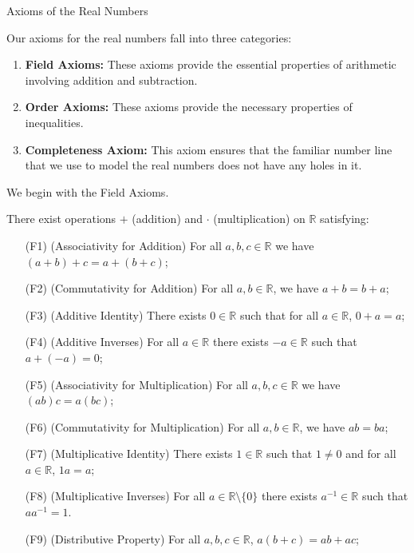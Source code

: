 \begin{section}{Axioms of the Real Numbers}\label{sec:AxiomsRealNumbers}

Our axioms for the real numbers fall into three categories:
\begin{enumerate}
\item \textbf{Field Axioms:} These axioms provide the essential properties of arithmetic involving addition and subtraction.
\item \textbf{Order Axioms:} These axioms provide the necessary properties of inequalities.
\item \textbf{Completeness Axiom:} This axiom ensures that the familiar number line that we use to model the real numbers does not have any holes in it.
\end{enumerate}

We begin with the Field Axioms.

\begin{axioms}\label{axiom:field axioms}
There exist operations $+$ (addition) and $\cdot$ (multiplication) on $\mathbb{R}$ satisfying:
\begin{enumerate}
\item[(F1)] (Associativity for Addition) For all $a, b, c\in \mathbb{R}$ we have $(a+b)+c = a+(b+c)$;
\item[(F2)] (Commutativity for Addition) For all $a,b\in \mathbb{R}$, we have $a+b=b+a$;
\item[(F3)] (Additive Identity) There exists $0\in\mathbb{R}$ such that for all $a\in\mathbb{R}$, $0+a=a$;
\item[(F4)] (Additive Inverses) For all $a\in\mathbb{R}$ there exists $-a\in\mathbb{R}$ such that $a+(-a)=0$;

\item[(F5)] (Associativity for Multiplication) For all $a, b, c\in \mathbb{R}$ we have $(ab)c = a(bc)$;
\item[(F6)] (Commutativity for Multiplication) For all $a,b\in \mathbb{R}$, we have $ab=ba$;
\item[(F7)] (Multiplicative Identity) There exists $1\in\mathbb{R}$ such that $1\neq 0$ and for all $a\in\mathbb{R}$, $1a=a$;
\item[(F8)] (Multiplicative Inverses) For all $a\in\mathbb{R}\setminus\{0\}$ there exists $a^{-1}\in\mathbb{R}$ such that $aa^{-1}=1$.
\item[(F9)] (Distributive Property) For all $a,b,c\in \mathbb{R}$, $a(b+c)=ab+ac$;
\end{enumerate}
\end{axioms}


\end{section}

